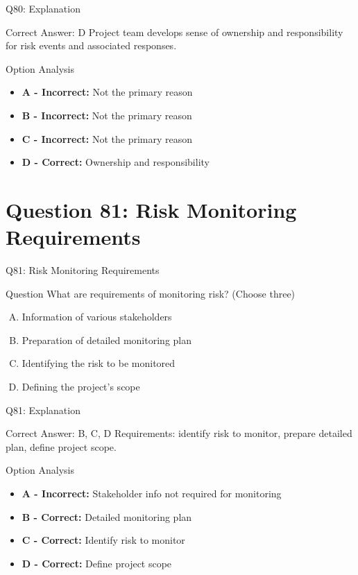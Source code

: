 \documentclass{beamer}
\begin{document}
	\begin{frame}{Q80: Explanation}
		\begin{block}{Correct Answer: D}
			Project team develops sense of ownership and responsibility for risk events and associated responses.
		\end{block}
		\begin{block}{Option Analysis}
			\begin{itemize}
				\item \textbf{A - Incorrect:} Not the primary reason
				\item \textbf{B - Incorrect:} Not the primary reason
				\item \textbf{C - Incorrect:} Not the primary reason
				\item \textbf{D - Correct:} Ownership and responsibility
			\end{itemize}
		\end{block}
	\end{frame}
	
	\section{Question 81: Risk Monitoring Requirements}
	
	\begin{frame}{Q81: Risk Monitoring Requirements}
		\begin{block}{Question}
			What are requirements of monitoring risk? (Choose three)
		\end{block}
		\begin{enumerate}[(A)]
			\item Information of various stakeholders
			\item Preparation of detailed monitoring plan
			\item Identifying the risk to be monitored
			\item Defining the project's scope
		\end{enumerate}
	\end{frame}
	
	\begin{frame}{Q81: Explanation}
		\begin{block}{Correct Answer: B, C, D}
			Requirements: identify risk to monitor, prepare detailed plan, define project scope.
		\end{block}
		\begin{block}{Option Analysis}
			\begin{itemize}
				\item \textbf{A - Incorrect:} Stakeholder info not required for monitoring
				\item \textbf{B - Correct:} Detailed monitoring plan
				\item \textbf{C - Correct:} Identify risk to monitor
				\item \textbf{D - Correct:} Define project scope
			\end{itemize}
		\end{block}
	\end{frame}
	
\end{document}

